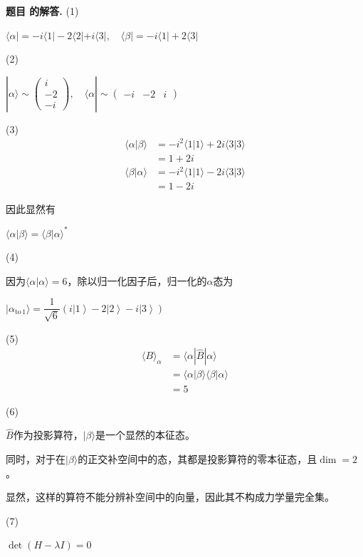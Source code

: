 \documentclass[12pt, a4paper, oneside]{ctexart}
\newcounter{problemname}
\newenvironment{solution}
  {\par\noindent\textbf{题目 \theproblemname 的解答. }}
  {\par}
\begin{document}
\begin{solution}
  (1)

  \centerline{$\langle \alpha | = -i \langle 1 | -2\langle 2 | +i\langle 3| ,\quad \langle \beta| = -i\langle 1 | +2\langle 3 |$}

  (2)

  \centerline{$|\alpha \rangle \sim \begin{pmatrix} i\\ -2 \\ -i \end{pmatrix} , \quad \langle \alpha | \sim \begin{pmatrix} -i & -2 & i \end{pmatrix}$ }

  (3)
  \begin{align*}
    \langle \alpha | \beta \rangle &= -i^2\langle1|1\rangle +2i\langle3|3\rangle\\
    &= 1+2i\\
    \langle \beta | \alpha \rangle &= -i^2\langle1|1\rangle -2i\langle3|3\rangle\\
    &= 1-2i
  \end{align*}

  因此显然有

  \centerline{$\langle\alpha|\beta\rangle = \langle\beta|\alpha\rangle^*$}

  (4)

  因为$\langle\alpha|\alpha\rangle = 6$，除以归一化因子后，归一化的$\alpha$态为

  \centerline{$|\alpha_{\mathrm{to\,1}}\rangle = \dfrac{1}{\sqrt{6}}\left(i\left|1\right\rangle - 2\left|2\right\rangle - i\left|3\right\rangle\right) $}

  (5)
  \begin{align*}
    \langle B \rangle_{\alpha} &= \langle \alpha | \hat{B} | \alpha \rangle \\
    &= \langle \alpha | \beta \rangle \langle \beta | \alpha \rangle\\
    &=5
  \end{align*}

  (6)

  $\hat{B}$作为投影算符，$|\beta\rangle$是一个显然的本征态。

  同时，对于在$|\beta\rangle$的正交补空间中的态，其都是投影算符的零本征态，且$\dim = 2$。

  显然，这样的算符不能分辨补空间中的向量，因此其不构成力学量完全集。

  (7)

  \centerline{$\det (H - \lambda I) = 0$}


\end{solution}
\end{document}
